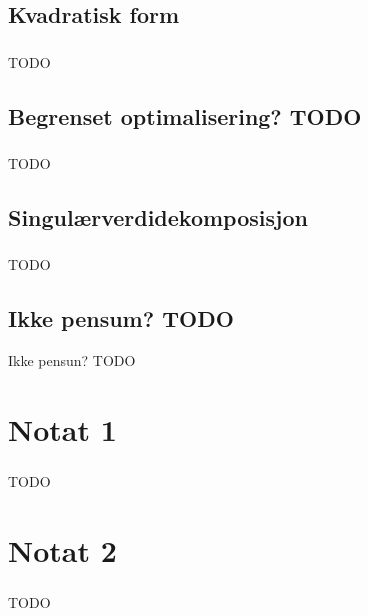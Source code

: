 \documentclass{article}
\begin{document}
    \subsection{Kvadratisk form}
      \subsubsection{}
        TODO
    \subsection{Begrenset optimalisering? TODO}
      \subsubsection{}
        TODO
    \subsection{Singulærverdidekomposisjon}
      \subsubsection{}
        TODO
    \subsection{Ikke pensum? TODO}
      Ikke pensun? TODO
  \section{Notat 1}
    \subsubsection{}
      TODO
  \section{Notat 2}
    \subsubsection{}
      TODO
\end{document}
